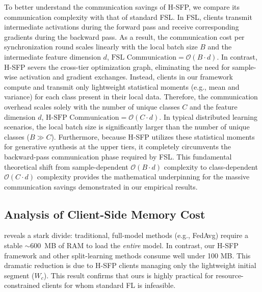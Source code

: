 To better understand the communication savings of H-SFP, we compare its communication complexity with that of standard FSL. In FSL, clients transmit intermediate activations during the forward pass and receive corresponding gradients during the backward pass. As a result, the communication cost per synchronization round scales linearly with the local batch size $B$ and the intermediate feature dimension $d$, $\text{FSL Communication} = \mathcal{O}(B \cdot d)$.
In contrast, H-SFP severs the cross-tier optimization graph, eliminating the need for sample-wise activation and gradient exchanges. Instead, clients in our framework compute and transmit only lightweight statistical moments (e.g., mean and variance) for each class present in their local data. Therefore, the communication overhead scales solely with the number of unique classes $C$ and the feature dimension $d$, $\text{H-SFP Communication} = \mathcal{O}(C \cdot d)$.
In typical distributed learning scenarios, the local batch size is significantly larger than the number of unique classes ($B \gg C$). Furthermore, because H-SFP utilizes these statistical moments for generative synthesis at the upper tiers, it completely circumvents the backward-pass communication phase required by FSL. This fundamental theoretical shift from sample-dependent $\mathcal{O}(B \cdot d)$ complexity to class-dependent $\mathcal{O}(C \cdot d)$ complexity provides the mathematical underpinning for the massive communication savings demonstrated in our empirical results.
\subsection{Analysis of Client-Side Memory Cost}
 reveals a stark divide: traditional, full-model methods (e.g., FedAvg) require a stable $\sim$600~MB of RAM to load the \textit{entire} model. In contrast, our H-SFP framework and other split-learning methods consume well under 100 MB. This dramatic reduction is due to H-SFP clients managing only the lightweight initial segment ($W_c$). This result confirms that ours is highly practical for resource-constrained clients for whom standard FL is infeasible.

